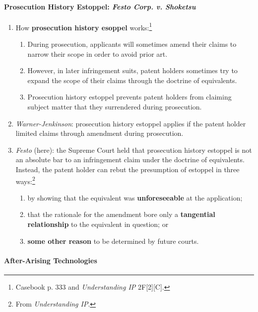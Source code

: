 \paragraph{Prosecution History Estoppel: \emph{Festo Corp. v. Shoketsu}}

\begin{enumerate}
    \item How \textbf{prosecution history esoppel} works:\footnote{Casebook p. 
    333 and \emph{Understanding IP} 2F[2][C].}
    \begin{enumerate}
        \item During prosecution, applicants will sometimes amend their claims 
        to narrow their scope in order to avoid prior art.
        \item However, in later infringement suits, patent holders sometimes 
        try to expand the scope of their claims through the doctrine of 
        equivalents.
        \item Prosecution history estoppel prevents patent holders from 
        claiming subject matter that they surrendered during prosecution.
    \end{enumerate}
    \item \emph{Warner-Jenkinson}: prosecution history estoppel applies if the 
    patent holder limited claims through amendment during prosecution.
    \item \emph{Festo} (here): the Supreme Court held that prosecution history 
    estoppel is not an absolute bar to an infringement claim under the 
    doctrine of equivalents. Instead, the patent holder can rebut the 
    presumption of estoppel in three ways:\footnote{From \emph{Understanding 
    IP}.}
    \begin{enumerate}
        \item by showing that the equivalent was \textbf{unforeseeable} at the 
        application;
        \item that the rationale for the amendment bore only a 
        \textbf{tangential relationship} to the equivalent in question; or
        \item \textbf{some other reason} to be determined by future courts.
    \end{enumerate}
\end{enumerate}

\paragraph{After-Arising Technologies}

